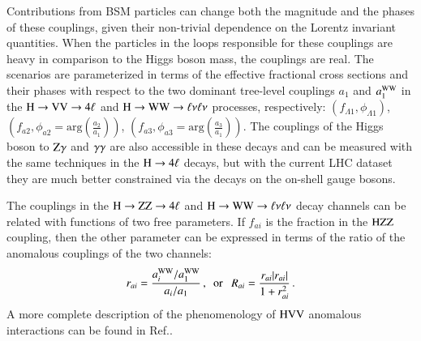 Contributions from BSM particles can change both the magnitude and the
phases of these couplings, given their non-trivial dependence on the
Lorentz invariant quantities. When the particles in the loops
responsible for these couplings are heavy in comparison to the Higgs
boson mass, the couplings are real.  The scenarios are parameterized
in terms of the effective fractional cross sections and their phases
with respect to the two dominant tree-level couplings $a_1$ and
$a_1^{\mathrm{W}\mathrm{W}}$ in the $\mathrm{H}\to \mathrm{V}\mathrm{V}\to 4\ell$ and $\mathrm{H}\to \mathrm{W}\mathrm{W}\to
\ell\nu\ell\nu$ processes, respectively:
$(f_{\Lambda1},\phi_{\Lambda1})$, $(f_{a2}, \phi_{a2} =
\mathrm{arg}\left(\frac{a_{2}}{a_{1}}\right))$, $(f_{a3},\phi_{a3} =
\mathrm{arg}\left(\frac{a_{3}}{a_{1}}\right))$.  The couplings of the
Higgs boson to $\mathrm{Z}\gamma$ and $\gamma\gamma$ are also accessible in these
decays and can be measured with the same techniques in the
$\mathrm{H}\to4\ell$ decays, but with the current LHC dataset they are much
better constrained via the decays on the on-shell gauge bosons.

The couplings in the $\mathrm{H}\to\mathrm{Z}\mathrm{Z}\to4\ell$ and $\mathrm{H}\to\mathrm{W}\mathrm{W}\to\ell\nu\ell\nu$ decay channels can be
related with functions of two free parameters. If $f_{ai}$ is the
fraction in the $\mathrm{H}\mathrm{Z}\mathrm{Z}$ coupling, then the other parameter can be
expressed in terms of the ratio of the anomalous couplings of the two
channels:
%
\begin{eqnarray}
r_{ai} = \frac{a_i^{\mathrm{W}\mathrm{W}} / a_1^{\mathrm{W}\mathrm{W}}  }{  a_i / a_1}\,, ~~{\rm or}~~~ R_{ai} = \frac{ r_{ai} |r_{ai}| }{  1 + r_{ai}^2 }  \, .
\label{eq:ratio_ww_zz}
\end{eqnarray} 
%
%
A more complete description of the phenomenology of $\mathrm{H}\mathrm{V}\mathrm{V}$
anomalous interactions can be found in Ref.\cite{CMS:2014gga}.



